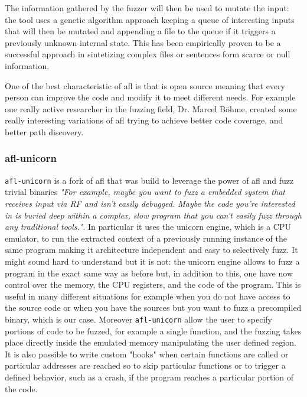 \documentclass[../main.tex]{subfiles}
\begin{document}
The information gathered by the fuzzer will then be used to mutate the input:
the tool uses a genetic algorithm approach keeping a queue of interesting inputs
that will then be mutated and appending a file to the queue if it triggers a
previously unknown internal state. This has been empirically proven to be a
successful approach in sintetizing complex files or sentences form scarce or
null information\cite{aflblog}.

One of the best characteristic of afl is that is open source meaning that every
person can improve the code and modify it to meet different needs. For example
one really active researcher in the fuzzing field, Dr. Marcel
B\"ohme\cite{mbhome}, created some really interesting variations of afl trying
to achieve better code coverage\cite{aflfast}\cite{greybf}, and better path
discovery\cite{pythia}.

\subsubsection{afl-unicorn}
\label{sub:afl-unicorn}

\texttt{afl-unicorn} is a fork of afl that was build to leverage the power of
afl and fuzz trivial binaries \textit{"For example, maybe you want to fuzz a
embedded system that receives input via RF and isn’t easily debugged. Maybe the
code you’re interested in is buried deep within a complex, slow program that you
can’t easily fuzz through any traditional tools."}\cite{aflunicorn}. In
particular it uses the unicorn engine\cite{unicorn}, which is a CPU emulator, to
run the extracted context of a previously running instance of the same program
making it architecture independent and easy to selectively fuzz. It might sound
hard to understand but it is not: the unicorn engine allows to fuzz a program
in the exact same way as before but, in addition to this, one have now control
over the memory, the CPU registers, and the code of the program. This is useful
in many different situations for example when you do not have access to the
source code or when you have the sources but you want to fuzz a precompiled
binary, which is our case. Moreover \texttt{afl-unicorn} allow the user to
specify portions of code to be fuzzed, for example a single function, and the
fuzzing takes place directly inside the emulated memory manipulating the user
defined region. It is also possible to write custom "hooks" when certain
functions are called or particular addresses are reached so to skip particular
functions or to trigger a defined behavior, such as a crash, if the program
reaches a particular portion of the code.
\end{document}
